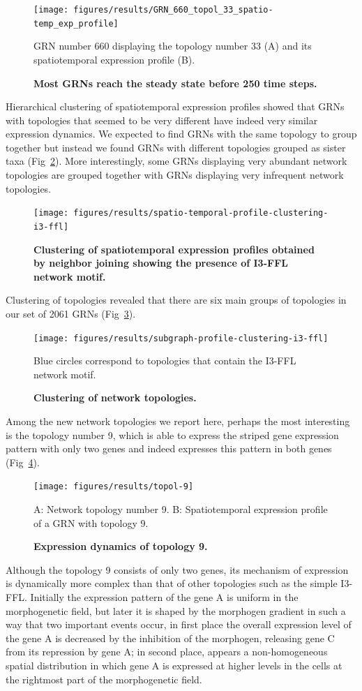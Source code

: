 \documentclass[10pt,letterpaper]{article}
\begin{document}
\begin{figure}[!h]
 \texttt{[image: figures/results/GRN\_660\_topol\_33\_spatio-temp\_exp\_profile]}
 \caption{\bf Most GRNs reach the steady state before 250 time steps.}
 GRN number 660 displaying the topology number 33 (A) and its spatiotemporal
 expression profile (B).
 \label{fig:profile}
\end{figure}

Hierarchical clustering of spatiotemporal expression profiles showed that GRNs
with topologies that seemed to be very different have indeed very similar
expression dynamics. We expected to find GRNs with the same topology to group
together but instead we found GRNs with different topologies grouped as sister
taxa (Fig~\ref{fig:exp-tree}). More interestingly, some GRNs displaying very
abundant network topologies are grouped together with GRNs displaying very
infrequent network topologies.

\begin{figure}[!h]
 \texttt{[image: figures/results/spatio-temporal-profile-clustering-i3-ffl]}
 \caption{\bf Clustering of spatiotemporal expression profiles obtained by
 neighbor joining showing the presence of I3-FFL network motif.}
 \label{fig:exp-tree}
\end{figure}

Clustering of topologies revealed that there are six main groups of topologies
in our set of 2061 GRNs (Fig~\ref{fig:subg-tree}).

\begin{figure}[!h]
 \texttt{[image: figures/results/subgraph-profile-clustering-i3-ffl]}
 \caption{\bf Clustering of network topologies.}
 Blue circles correspond to topologies that contain the I3-FFL network motif.
 \label{fig:subg-tree}
\end{figure}

Among the new network topologies we report here, perhaps the most interesting
is the topology number 9, which is able to express the striped gene expression
pattern with only two genes and indeed expresses this pattern in both genes
(Fig~\ref{fig:topol9}).

\begin{figure}[!h]
 \texttt{[image: figures/results/topol-9]}
 \caption{\bf Expression dynamics of topology 9.}
 A: Network topology number 9. B: Spatiotemporal expression profile of a GRN
 with topology 9.
 \label{fig:topol9}
\end{figure}

Although the topology 9 consists of only two genes, its mechanism of expression
is dynamically more complex than that of other topologies such as the simple
I3-FFL. Initially the expression pattern of the gene A is uniform in the
morphogenetic field, but later it is shaped by the morphogen gradient in such a
way that two important events occur, in first place the overall expression
level of the gene A is decreased by the inhibition of the morphogen, releasing
gene C from its repression by gene A; in second place, appears a non-homogeneous
spatial distribution in which gene A is expressed at higher levels in the cells
at the rightmost part of the morphogenetic field.\\
\end{document}
